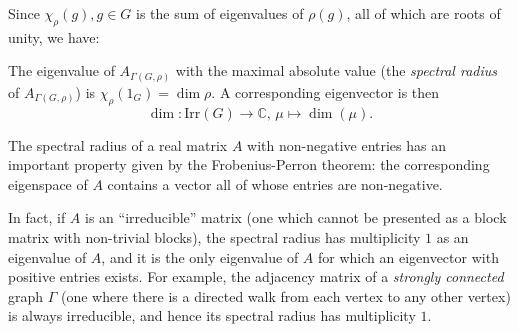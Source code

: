 \documentclass[ALCO]{cedram}
\newcommand{\C}{{\mathbb C}}
\begin{document}
Since $\chi_{\rho}(g), g\in G$ is the sum of eigenvalues of $\rho(g)$, all of 
which are roots of unity, we have:
\begin{coro}\label{cor:spectral_radius_adj_matrix}
 The eigenvalue of $A_{\Gamma(G, \rho)}$ with the maximal absolute value (the 
{\it spectral radius} of $A_{\Gamma(G, \rho)}$) is $\chi_\rho(1_G) = \dim \rho$. 
A corresponding eigenvector is then $$\dim:\mathrm{Irr}(G) \to \C, \, \mu \mapsto 
\dim(\mu).$$
\end{coro}

The spectral radius of a real matrix $A$ with non-negative entries has an important property given by the Frobenius-Perron theorem: the corresponding eigenspace of $A$ contains a vector all of whose entries are non-negative. 

In fact, if $A$ is an ``irreducible'' matrix (one which cannot be presented as a block matrix with non-trivial blocks), the spectral radius has multiplicity $1$ as an eigenvalue of $A$, and it is the only eigenvalue of $A$ for which an eigenvector with positive entries exists. For example, the adjacency matrix of a {\it strongly connected} graph $\Gamma$ (one where there is a directed walk from each vertex to any other vertex) is always irreducible, and hence its spectral radius has multiplicity $1$.
\end{document}
